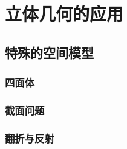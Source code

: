\chapter{立体几何的应用}

\section{特殊的空间模型}
\subsection{四面体}
\clearpage
\subsection{截面问题}
\clearpage
\subsection{翻折与反射}
\clearpage
